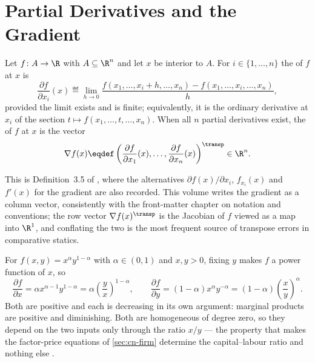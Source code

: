 \section{Partial Derivatives and the Gradient}\label{sec:cn-partial}

\begin{definition}\label{def:partial}
	Let $f\colon A\to\R$ with $A\subseteq\R^n$ and let $x$ be interior to $A$. For
	$i\in\{1,\dots,n\}$ the  of
	$f$ at $x$ is
	\[
		\frac{\partial f}{\partial x_i}(x)\eqdef
		\lim_{h\to0}\frac{f(x_1,\dots,x_i+h,\dots,x_n)-f(x_1,\dots,x_i,\dots,x_n)}{h},
	\]
	provided the limit exists and is finite; equivalently, it is the ordinary
	derivative at $x_i$ of the section $t\mapsto f(x_1,\dots,t,\dots,x_n)$. When all
	$n$ partial derivatives exist, the  of $f$ at $x$ is the vector
	\[
		\nabla f(x)\eqdef
		\left(\frac{\partial f}{\partial x_1}(x),\dots,
		\frac{\partial f}{\partial x_n}(x)\right)^{\transp}\in\R^n .
	\]
\end{definition}

This is Definition~3.5 of \textcite{fukuda2026notes}
\autocite[slides 46, 48]{fukuda2026calculus}, where the alternatives
$\partial f(x)/\partial x_i$, $f_{x_i}(x)$ and $f'(x)$ for the gradient are also
recorded. This volume writes the gradient as a column vector, consistently with
the front-matter chapter on notation and conventions; the row vector
$\nabla f(x)^{\transp}$ is the Jacobian of $f$ viewed as a map into $\R^1$, and
conflating the two is the most frequent source of transpose errors in
comparative statics.

\begin{eg}\label{eg:cobb-douglas-partials}
	For $f(x,y)=x^{\alpha}y^{1-\alpha}$ with $\alpha\in(0,1)$ and $x,y>0$, fixing
	$y$ makes $f$ a power function of $x$, so
	\[
		\frac{\partial f}{\partial x}=\alpha x^{\alpha-1}y^{1-\alpha}
		=\alpha\left(\frac{y}{x}\right)^{1-\alpha},
		\qquad
		\frac{\partial f}{\partial y}=(1-\alpha)x^{\alpha}y^{-\alpha}
		=(1-\alpha)\left(\frac{x}{y}\right)^{\alpha}.
	\]
	Both are positive and each is decreasing in its own argument: marginal products
	are positive and diminishing. Both are homogeneous of degree zero, so they depend
	on the two inputs only through the ratio $x/y$ --- the property that makes the
	factor-price equations of \autoref{sec:cn-firm} determine the capital--labour
	ratio and nothing else \autocite[slide 47]{fukuda2026calculus}.
\end{eg}

